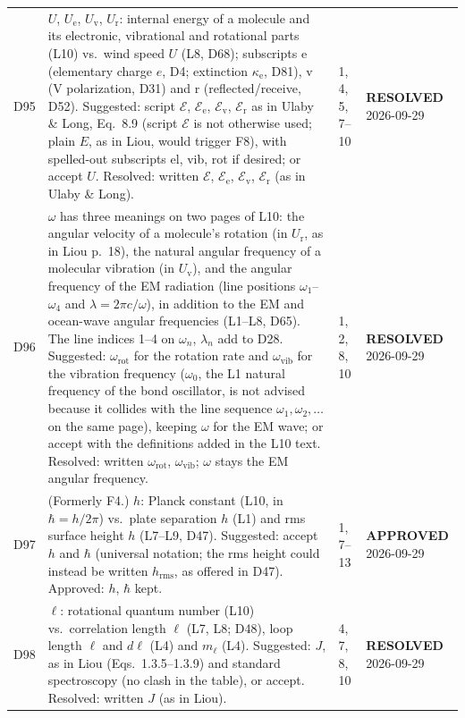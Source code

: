 \documentclass[11pt, oneside]{article}
\newcommand{\approved}{\textbf{APPROVED}}
\newcommand{\resolved}{\textbf{RESOLVED}}
\begin{document}
\begin{longtable}{l >{\raggedright\arraybackslash}p{} l l}
D95 & $U$, $U_\mathrm{e}$, $U_\mathrm{v}$, $U_\mathrm{r}$: internal energy of a molecule and its electronic, vibrational and rotational parts (L10) vs.\ wind speed $U$ (L8, D68); subscripts e (elementary charge $e$, D4; extinction $\kappa_\mathrm{e}$, D81), v (V polarization, D31) and r (reflected/receive, D52). Suggested: script $\mathcal{E}$, $\mathcal{E}_\mathrm{e}$, $\mathcal{E}_\mathrm{v}$, $\mathcal{E}_\mathrm{r}$ as in Ulaby \& Long, Eq.~8.9 (script $\mathcal{E}$ is not otherwise used; plain $E$, as in Liou, would trigger F8), with spelled-out subscripts el, vib, rot if desired; or accept $U$. Resolved: written $\mathcal{E}$, $\mathcal{E}_\mathrm{e}$, $\mathcal{E}_\mathrm{v}$, $\mathcal{E}_\mathrm{r}$ (as in Ulaby \& Long). & 1, 4, 5, 7--10 & \resolved{} 2026-09-29 \\
D96 & $\omega$ has three meanings on two pages of L10: the angular velocity of a molecule's rotation (in $U_\mathrm{r}$, as in Liou p.~18), the natural angular frequency of a molecular vibration (in $U_\mathrm{v}$), and the angular frequency of the EM radiation (line positions $\omega_1$--$\omega_4$ and $\lambda = 2\pi c/\omega$), in addition to the EM and ocean-wave angular frequencies (L1--L8, D65). The line indices 1--4 on $\omega_n$, $\lambda_n$ add to D28. Suggested: $\omega_\mathrm{rot}$ for the rotation rate and $\omega_\mathrm{vib}$ for the vibration frequency ($\omega_0$, the L1 natural frequency of the bond oscillator, is not advised because it collides with the line sequence $\omega_1, \omega_2, \ldots$ on the same page), keeping $\omega$ for the EM wave; or accept with the definitions added in the L10 text. Resolved: written $\omega_\mathrm{rot}$, $\omega_\mathrm{vib}$; $\omega$ stays the EM angular frequency. & 1, 2, 8, 10 & \resolved{} 2026-09-29 \\
D97 & (Formerly F4.) $h$: Planck constant (L10, in $\hbar = h/2\pi$) vs.\ plate separation $h$ (L1) and rms surface height $h$ (L7--L9, D47). Suggested: accept $h$ and $\hbar$ (universal notation; the rms height could instead be written $h_\mathrm{rms}$, as offered in D47). Approved: $h$, $\hbar$ kept. & 1, 7--13 & \approved{} 2026-09-29 \\
D98 & $\ell$: rotational quantum number (L10) vs.\ correlation length $\ell$ (L7, L8; D48), loop length $\ell$ and $d\boldsymbol{\ell}$ (L4) and $m_\ell$ (L4). Suggested: $J$, as in Liou (Eqs.~1.3.5--1.3.9) and standard spectroscopy (no clash in the table), or accept. Resolved: written $J$ (as in Liou). & 4, 7, 8, 10 & \resolved{} 2026-09-29 \\

\end{longtable}
\end{document}
